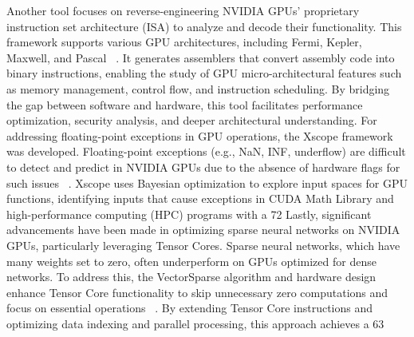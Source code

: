 Another tool focuses on reverse-engineering NVIDIA GPUs' proprietary instruction set architecture (ISA) to analyze and decode their functionality. This framework supports various GPU architectures, including Fermi, Kepler, Maxwell, and Pascal ~\cite{Hayes2019}. It generates assemblers that convert assembly code into binary instructions, enabling the study of GPU micro-architectural features such as memory management, control flow, and instruction scheduling. By bridging the gap between software and hardware, this tool facilitates performance optimization, security analysis, and deeper architectural understanding.
For addressing floating-point exceptions in GPU operations, the Xscope framework was developed. Floating-point exceptions (e.g., NaN, INF, underflow) are difficult to detect and predict in NVIDIA GPUs due to the absence of hardware flags for such issues ~\cite{Laguna2022}. Xscope uses Bayesian optimization to explore input spaces for GPU functions, identifying inputs that cause exceptions in CUDA Math Library and high-performance computing (HPC) programs with a 72%
Lastly, significant advancements have been made in optimizing sparse neural networks on NVIDIA GPUs, particularly leveraging Tensor Cores. Sparse neural networks, which have many weights set to zero, often underperform on GPUs optimized for dense networks. To address this, the VectorSparse algorithm and hardware design enhance Tensor Core functionality to skip unnecessary zero computations and focus on essential operations ~\cite{Zhu2019}. By extending Tensor Core instructions and optimizing data indexing and parallel processing, this approach achieves a 63%

